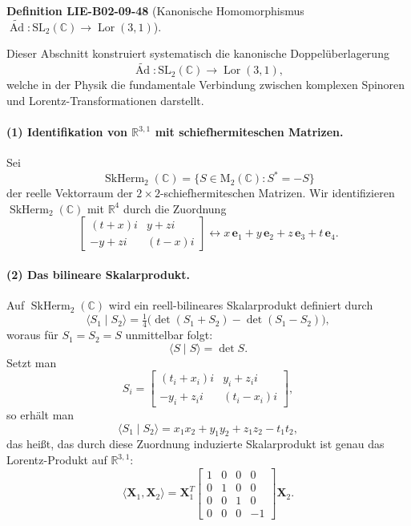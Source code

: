 \documentclass[10pt, letterpaper]{article}
\newcommand{\CustomHeading}[3]{%
  \par\medskip\noindent%
  \textbf{#1 #2} \textnormal{(#3)}.\enskip%
}
\newenvironment{DEF}[2]{\begin{unitbox}\CustomHeading{Definition}{#1}{#2}}{\end{unitbox}}
\begin{document}
\begin{DEF}{LIE-B02-09-48}{Kanonische Homomorphismus \(\widetilde{\operatorname{Ad}}:\mathrm{SL}_2(\mathbb{C})\to \operatorname{Lor}(3,1)\)}
Dieser Abschnitt konstruiert systematisch die kanonische Doppelüberlagerung
\[
\widetilde{\operatorname{Ad}}:\mathrm{SL}_2(\mathbb{C})\longrightarrow \operatorname{Lor}(3,1),
\]
welche in der Physik die fundamentale Verbindung zwischen komplexen Spinoren und Lorentz-Transformationen darstellt.

\paragraph{(1) Identifikation von \(\mathbb{R}^{3,1}\) mit schiefhermiteschen Matrizen.}
Sei
\[
\operatorname{SkHerm}_2(\mathbb{C})
=\{S\in \mathrm{M}_2(\mathbb{C}) : S^*=-S\}
\]
der reelle Vektorraum der \(2\times2\)-schiefhermiteschen Matrizen.
Wir identifizieren \(\operatorname{SkHerm}_2(\mathbb{C})\) mit \(\mathbb{R}^{4}\) durch die Zuordnung
\[
\begin{bmatrix}
(t+x)i & y+zi\\
-y+zi & (t-x)i
\end{bmatrix}
\longleftrightarrow
x\,\mathbf{e}_1+y\,\mathbf{e}_2+z\,\mathbf{e}_3+t\,\mathbf{e}_4.
\]

\paragraph{(2) Das bilineare Skalarprodukt.}
Auf \(\operatorname{SkHerm}_2(\mathbb{C})\) wird ein reell-bilineares Skalarprodukt definiert durch
\[
\langle S_1\mid S_2\rangle
=\tfrac{1}{4}\bigl(\det(S_1+S_2)-\det(S_1-S_2)\bigr),
\]
woraus für \(S_1=S_2=S\) unmittelbar folgt:
\[
\langle S\mid S\rangle=\det S.
\]
Setzt man
\[
S_i=
\begin{bmatrix}
(t_i+x_i)i & y_i+z_i i\\
-y_i+z_i i & (t_i-x_i)i
\end{bmatrix},
\]
so erhält man
\[
\langle S_1\mid S_2\rangle
=x_1x_2+y_1y_2+z_1z_2-t_1t_2,
\]
das heißt, das durch diese Zuordnung induzierte Skalarprodukt ist genau das Lorentz-Produkt auf \(\mathbb{R}^{3,1}\):
\[
\langle\mathbf{X}_1,\mathbf{X}_2\rangle
=\mathbf{X}_1^T
\begin{bmatrix}
1 & 0 & 0 & 0\\
0 & 1 & 0 & 0\\
0 & 0 & 1 & 0\\
0 & 0 & 0 & -1
\end{bmatrix}
\mathbf{X}_2.
\]


\end{DEF}
\end{document}
